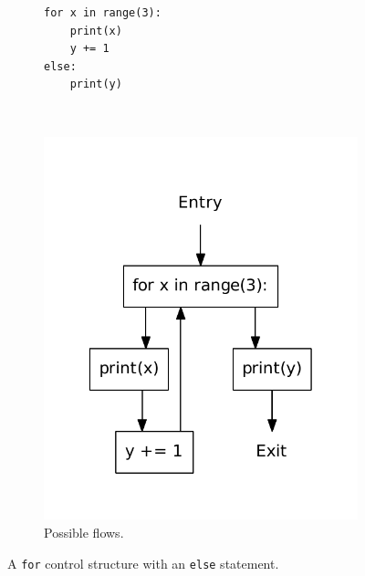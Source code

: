 \begin{figure}
  \centering
  \begin{subfigure}[b]{0.4\textwidth}
    \begin{lstlisting}[style=python, caption={Code example.}, label={python:for:else:code}]
for x in range(3):
    print(x)
    y += 1
else:
    print(y)
    \end{lstlisting}
  \end{subfigure}
  ~ %
  \begin{subfigure}[b]{0.4\textwidth}
    \centering
    \includegraphics[scale=.5]{./figures/for_complete.pdf}
    \caption{Possible flows.}
    \label{python:for:else:flow}
  \end{subfigure}
  \caption{A \texttt{for} control structure with an \texttt{else} statement.}
  \label{python:for:else}
\end{figure}
